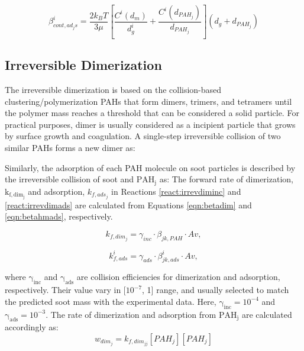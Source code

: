 \begin{equation}
	\beta^i_{cont, ad_js}=
		\frac{2 k_B T}{3 \mu}
		\left[
			\frac{C^i\left(d_m\right)}{d^i_g}+
			\frac{C^i\left(d_{PAH_j}\right)}{d_{PAH_j}}
		\right]
		\left(d_g+d_{PAH_j}\right)
	\label{eqn:betacontads}
\end{equation}

\subsection{Irreversible Dimerization}

The irreversible dimerization is based on the collision-based clustering/polymerization PAHs that form dimers, trimers, and tetramers until the polymer mass reaches a threshold that can be considered a solid particle. For practical purposes, dimer is usually considered as a incipient particle that grows by surface growth and coagulation. A single-step irreversible collision of two similar PAHs forms a new dimer as:

Similarly, the adsorption of each PAH molecule on soot particles is described by the irreversible collision of soot and $\mathrm{PAH_j}$ as:
The forward rate of dimerization, $\mathrm{k_{f,dim_j}}$ and adsorption, $k_{f,ads_j}$ in Reactions \eqref{react:irrevdiminc} and \eqref{react:irrevdimads} are calculated from Equations \eqref{eqn:betadim} and \eqref{eqn:betahmads}, respectively.

\begin{equation}
	k_{f,dim_j}=
	\gamma_{inc}\cdot\beta_{jk,PAH}\cdot Av
	\label{eqn:kfdim},
\end{equation}

\begin{equation}
	k^i_{f,ads}=
	\gamma_{ads}\cdot\beta^i_{jk,ads}\cdot Av
	\label{eqn:kfads},
\end{equation}

where $\mathrm{\gamma_{inc}}$ and $\mathrm{\gamma_{ads}}$ are collision efficiencies for dimerization and adsorption, respectively. Their value vary in [$\mathrm{10^{-7}}$, 1] range, and usually selected to match the predicted soot mass with the experimental data. Here, $\mathrm{\gamma_{inc}}=10^{-4}$ and $\mathrm{\gamma_{ads}=10^{-3}}$. The rate of dimerization and adsorption from $\mathrm{PAH_j}$ are calculated accordingly as:
\begin{equation}
	w_{dim_j} = k_{f,dim_{jj}} [PAH_j] [PAH_j]
\end{equation}

